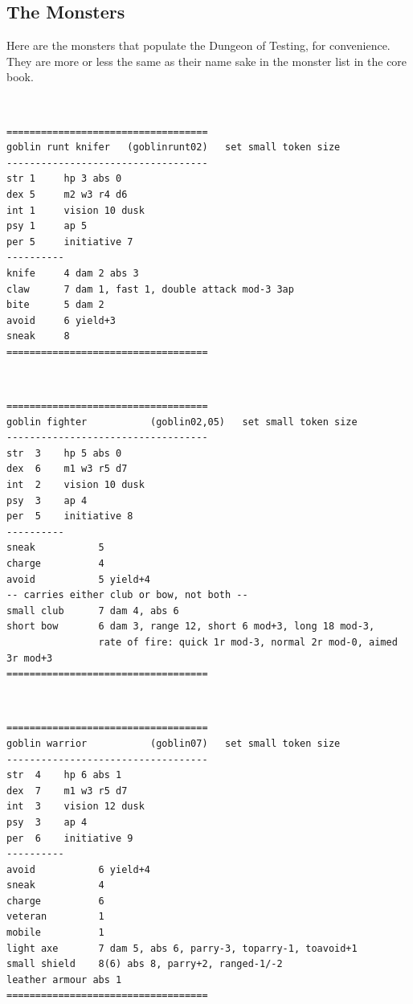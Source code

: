 


\subsection*{The Monsters}

Here are the monsters that populate the Dungeon of Testing, for convenience. They are more or less the same as their name sake in the monster list in the core book.

\

\goodbreak \begin{samepage} \small \begin{verbatim}
===================================
goblin runt knifer   (goblinrunt02)   set small token size
-----------------------------------
str 1     hp 3 abs 0
dex 5     m2 w3 r4 d6
int 1     vision 10 dusk
psy 1     ap 5
per 5     initiative 7
----------
knife     4 dam 2 abs 3
claw      7 dam 1, fast 1, double attack mod-3 3ap
bite      5 dam 2
avoid     6 yield+3
sneak     8
===================================
\end{verbatim} \normalsize \end{samepage}

\

\goodbreak \begin{samepage} \small \begin{verbatim}
===================================
goblin fighter           (goblin02,05)   set small token size
-----------------------------------
str  3    hp 5 abs 0
dex  6    m1 w3 r5 d7
int  2    vision 10 dusk
psy  3    ap 4
per  5    initiative 8
----------
sneak           5
charge          4
avoid           5 yield+4
-- carries either club or bow, not both --
small club      7 dam 4, abs 6
short bow       6 dam 3, range 12, short 6 mod+3, long 18 mod-3,
                rate of fire: quick 1r mod-3, normal 2r mod-0, aimed 3r mod+3
===================================
\end{verbatim} \normalsize \end{samepage}

\

\goodbreak \begin{samepage} \small \begin{verbatim}
===================================
goblin warrior           (goblin07)   set small token size
-----------------------------------
str  4    hp 6 abs 1
dex  7    m1 w3 r5 d7
int  3    vision 12 dusk
psy  3    ap 4
per  6    initiative 9
----------
avoid           6 yield+4
sneak           4
charge          6
veteran         1
mobile          1
light axe       7 dam 5, abs 6, parry-3, toparry-1, toavoid+1
small shield    8(6) abs 8, parry+2, ranged-1/-2
leather armour abs 1
===================================
\end{verbatim} \normalsize \end{samepage}

